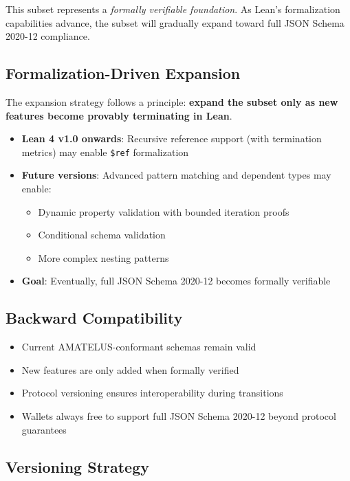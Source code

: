 This subset represents a \emph{formally verifiable foundation}. As Lean's formalization capabilities advance, the subset will gradually expand toward full JSON Schema 2020-12 compliance.

\subsection{Formalization-Driven Expansion}

The expansion strategy follows a principle: \textbf{expand the subset only as new features become provably terminating in Lean}.

\begin{itemize}
  \item \textbf{Lean 4 v1.0 onwards}: Recursive reference support (with termination metrics) may enable \texttt{\$ref} formalization
  \item \textbf{Future versions}: Advanced pattern matching and dependent types may enable:
    \begin{itemize}
      \item Dynamic property validation with bounded iteration proofs
      \item Conditional schema validation
      \item More complex nesting patterns
    \end{itemize}
  \item \textbf{Goal}: Eventually, full JSON Schema 2020-12 becomes formally verifiable
\end{itemize}

\subsection{Backward Compatibility}

\begin{itemize}
  \item Current AMATELUS-conformant schemas remain valid
  \item New features are only added when formally verified
  \item Protocol versioning ensures interoperability during transitions
  \item Wallets always free to support full JSON Schema 2020-12 beyond protocol guarantees
\end{itemize}

\subsection{Versioning Strategy}

